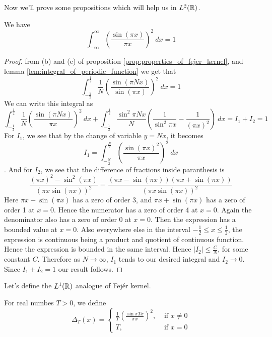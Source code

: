 Now we'll prove some propositions which will help us in $L^2(\mathbb R)$. 
\begin{proposition}
  \label{prop:integral_of_sin(pi_x)^2/(pi_x)^2}
  We have $$\int_{-\infty}^{\infty} \left(\frac{\sin(\pi x)}{\pi x}\right)^2 \ dx = 1$$
\end{proposition}
\begin{proof}
  from (b) and (e) of proposition \ref{prop:properties_of_fejer_kernel}, and lemma \ref{lem:integral_of_periodic_function} we get that $$\int_{-\frac{1}{2}}^{\frac{1}{2}} \frac{1}{N} \left(\frac{\sin(\pi Nx)}{\sin (\pi x)}\right)^2 \ dx = 1$$
  We can write this integral as $$\int_{-\frac{1}{2}}^{\frac{1}{2}} \frac{1}{N} \left(\frac{\sin(\pi Nx)}{\pi x}\right)^2 \ dx + \int_{-\frac{1}{2}}^{\frac{1}{2}} \frac{\sin^2 \pi Nx}{N} \left( \frac{1}{\sin^2 \pi x} - \frac{1}{(\pi x)^2} \right) \ dx = I_1 + I_2 = 1 $$
  For $I_1$, we see that by the change of variable $y = Nx$, it becomes $$I_1 = \int_{-\frac{N}{2}}^{\frac{N}{2}} \left(\frac{\sin(\pi x)^2}{\pi x}\right)^2 \ dx $$. 
  And for $I_2$, we see that the difference of fractions inside paranthesis is $$\frac{(\pi x)^2 - \sin^2(\pi x)}{(\pi x \sin(\pi x))^2} = \frac{(\pi x - \sin(\pi x))(\pi x + \sin(\pi x))}{(\pi x \sin(\pi x))^2}$$
  Here $\pi x - \sin(\pi x)$ has a zero of order 3, and $\pi x + \sin(\pi x)$ has a zero of order 1 at $x=0$. Hence the numerator has a zero of order 4 at $x=0$. Again the denominator also has a zero of order 0 at $x=0$. Then the expression has a bounded value at $x=0$. Also everywhere else in the interval $-\frac{1}{2} \le x \le \frac{1}{2}$, the expression is continuous being a product and quotient of continuous function. Hence the expression is bounded in the same interval. Hence $|I_2| \le \frac{C}{N}$, for some constant $C$. Therefore as $N \to \infty$, $I_1$ tends to our desired integral and $I_2 \to 0$. Since $I_1 + I_2 = 1$ our result follows. 
\end{proof}

Let's define the $L^1(\mathbb R)$ analogue of Fej\'er kernel. 
\begin{definition}
  For real numbes $T > 0$, we define 
  \label{def:L1(R)_analogue_of_fejer_kernel}
  $$\Delta_T(x) =
  \begin{cases}
    \frac{1}{T}\left(\frac{\sin \pi Tx}{\pi x}\right)^2, &\text{ if }x \neq 0\\
    T, &\text{ if } x=0
  \end{cases}$$
\end{definition}

